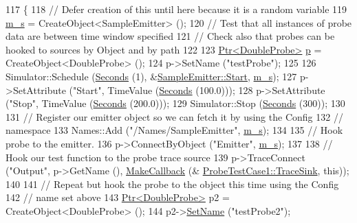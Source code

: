 \begin{DoxyCode}
117 \{
118   \textcolor{comment}{// Defer creation of this until here because it is a random variable}
119   \hyperlink{classProbeTestCase1_a982ddaa77f28cc097601f056e2174ec3}{m\_s} = CreateObject<SampleEmitter> ();
120   \textcolor{comment}{// Test that all instances of probe data are between time window specified}
121   \textcolor{comment}{// Check also that probes can be hooked to sources by Object and by path}
122 
123   \hyperlink{classns3_1_1Ptr}{Ptr<DoubleProbe>} \hyperlink{lte__link__budget_8m_ac9de518908a968428863f829398a4e62}{p} = CreateObject<DoubleProbe> ();
124   p->SetName (\textcolor{stringliteral}{"testProbe"});
125 
126   Simulator::Schedule (\hyperlink{group__timecivil_ga33c34b816f8ff6628e33d5c8e9713b9e}{Seconds} (1), &\hyperlink{classSampleEmitter_a9de49e02a2e53b76beae11bc2f9f029b}{SampleEmitter::Start}, 
      \hyperlink{classProbeTestCase1_a982ddaa77f28cc097601f056e2174ec3}{m\_s});
127   p->SetAttribute (\textcolor{stringliteral}{"Start"}, TimeValue (\hyperlink{group__timecivil_ga33c34b816f8ff6628e33d5c8e9713b9e}{Seconds} (100.0)));
128   p->SetAttribute (\textcolor{stringliteral}{"Stop"}, TimeValue (\hyperlink{group__timecivil_ga33c34b816f8ff6628e33d5c8e9713b9e}{Seconds} (200.0)));
129   Simulator::Stop (\hyperlink{group__timecivil_ga33c34b816f8ff6628e33d5c8e9713b9e}{Seconds} (300));
130 
131   \textcolor{comment}{// Register our emitter object so we can fetch it by using the Config}
132   \textcolor{comment}{// namespace}
133   Names::Add (\textcolor{stringliteral}{"/Names/SampleEmitter"}, \hyperlink{classProbeTestCase1_a982ddaa77f28cc097601f056e2174ec3}{m\_s});
134 
135   \textcolor{comment}{// Hook probe to the emitter.}
136   p->ConnectByObject (\textcolor{stringliteral}{"Emitter"}, \hyperlink{classProbeTestCase1_a982ddaa77f28cc097601f056e2174ec3}{m\_s});
137 
138   \textcolor{comment}{// Hook our test function to the probe trace source}
139   p->TraceConnect (\textcolor{stringliteral}{"Output"}, p->GetName (), \hyperlink{group__makecallbackmemptr_ga9376283685aa99d204048d6a4b7610a4}{MakeCallback} (&
      \hyperlink{classProbeTestCase1_a3a4460631c38c611169287e88ea0df39}{ProbeTestCase1::TraceSink}, \textcolor{keyword}{this}));
140 
141   \textcolor{comment}{// Repeat but hook the probe to the object this time using the Config}
142   \textcolor{comment}{// name set above}
143   \hyperlink{classns3_1_1Ptr}{Ptr<DoubleProbe>} p2 = CreateObject<DoubleProbe> ();
144   p2->\hyperlink{classns3_1_1DataCollectionObject_a9bf5a3af1190f7efadb1baae36889eaa}{SetName} (\textcolor{stringliteral}{"testProbe2"});

\end{DoxyCode}
